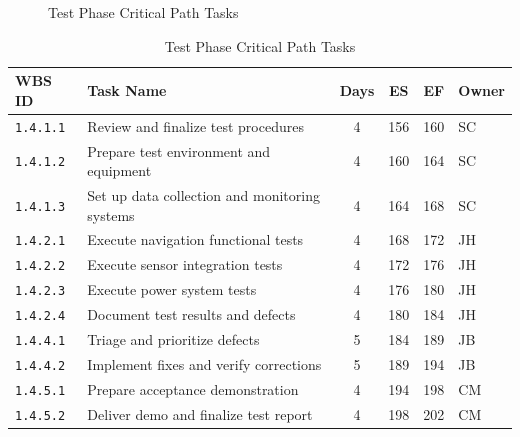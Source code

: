 \begin{figure}[H]
{
}%
\caption{Test Phase Critical Path Tasks}
\label{fig:nld_test_critical}
\end{figure}

\begin{table}[H]
\centering
\small
{}
\begin{tabular}{|l|p{5cm}|c|c|c|l|}
\hline
\rowcolor{testgreen!40}
\textbf{WBS ID} & \textbf{Task Name} & \textbf{Days} & \textbf{ES} & \textbf{EF} & \textbf{Owner} \\
\hline
\texttt{1.4.1.1} & Review and finalize test procedures & 4 & 156 & 160 & SC \\
\hline
\texttt{1.4.1.2} & Prepare test environment and equipment & 4 & 160 & 164 & SC \\
\hline
\texttt{1.4.1.3} & Set up data collection and monitoring systems & 4 & 164 & 168 & SC \\
\hline
\texttt{1.4.2.1} & Execute navigation functional tests & 4 & 168 & 172 & JH \\
\hline
\texttt{1.4.2.2} & Execute sensor integration tests & 4 & 172 & 176 & JH \\
\hline
\texttt{1.4.2.3} & Execute power system tests & 4 & 176 & 180 & JH \\
\hline
\texttt{1.4.2.4} & Document test results and defects & 4 & 180 & 184 & JH \\
\hline
\texttt{1.4.4.1} & Triage and prioritize defects & 5 & 184 & 189 & JB \\
\hline
\texttt{1.4.4.2} & Implement fixes and verify corrections & 5 & 189 & 194 & JB \\
\hline
\texttt{1.4.5.1} & Prepare acceptance demonstration & 4 & 194 & 198 & CM \\
\hline
\texttt{1.4.5.2} & Deliver demo and finalize test report & 4 & 198 & 202 & CM \\
\hline
\end{tabular}
\caption{Test Phase Critical Path Tasks}
\label{tab:nld_test_critical}
\end{table}

